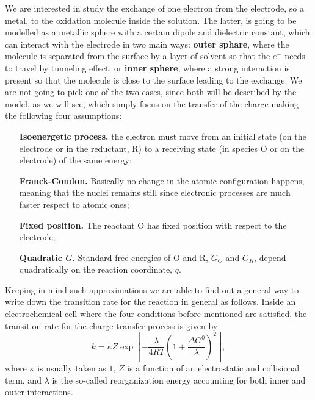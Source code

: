 We are interested in study the exchange of one electron from the electrode, so a metal, to the oxidation molecule inside the solution. The latter, is going to be modelled as a metallic sphere with a certain dipole and dielectric constant, which can interact with the electrode in two main ways: \textbf{outer sphare}, where the molecule is separated from the surface by a layer of solvent so that the $e^-$ needs to travel by tunneling effect, or \textbf{inner sphere}, where a strong interaction is present so that the molecule is close to the surface leading to the exchange. We are not going to pick one of the two cases, since both will be described by the model, as we will see, which simply focus on the transfer of the charge making the following four assumptions:
\begin{itemize}[align=left, leftmargin=*]
    \item[\textbf{Isoenergetic process.}] the electron must move from an initial state (on the electrode or in the reductant, R) to a receiving state (in species O or on the electrode) of the same energy;
    \item[\textbf{Franck-Condon.}] Basically no change in the atomic configuration happens, meaning that the nuclei remains still since electronic processes are much faster respect to atomic ones;
    \item[\textbf{Fixed position.}] The reactant O has fixed position with respect to the electrode;
    \item[\textbf{Quadratic $G$.}] Standard free energies of O and R, $G_O$ and $G_R$, depend quadratically on the reaction coordinate, $q$. 
\end{itemize}
Keeping in mind such approximations we are able to find out a general way to write down the transition rate for the reaction in general as follows.
{
    Inside an electrochemical cell where the four conditions before mentioned are satisfied, the transition rate for the charge transfer process is given by
    \begin{equation}
        k = \kappa Z \exp\left[ -\frac{\lambda}{4RT}\left( 1 + \frac{\Delta G^0}{\lambda} \right)^2  \right],
    \end{equation}
    where $\kappa$ is usually taken as $1$, $Z$ is a function of an electrostatic and collisional term, and $\lambda$ is the so-called reorganization energy accounting for both inner and outer interactions.
}
